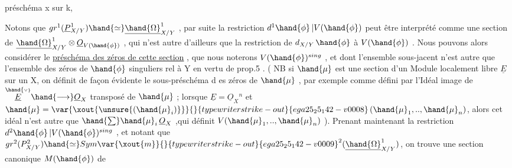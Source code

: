 
préschéma x sur k, 

Notons que $gr^1(\underline{P}^1_{X/Y}) \hand{\simeq} \underline{\hand{\Omega}}^1_{X/Y}$ , par suite la restriction
$d^1\hand{\phi}\,|V(\hand{\phi})$ peut être interprété comme une section de $\underline{\hand{\Omega}}^1_{X/Y} \otimes \underline{O}_{V(\hand{\phi})}$ ,
qui n'est autre d'ailleurs que la restriction de $d_{X/Y}\,\hand{\phi}$ à $V(\hand{\phi})$ . Nous
pouvons alors considérer le \uline{préschéma des zéros de cette section} , que
nous noterons $V(\hand{\phi})^{sing}$ , et dont l'ensemble sous-jacent n'est autre
que l'ensemble des zéros de $\hand{\phi}$ singuliers rel à Y en vertu de prop.5 .
( NB si  $\hand{\mu}$ est une section d'un Module localement libre  $\underline{E}$ sur un
  X, on définit de façon évidente le sous-préschéma d es
zéros de $\hand{\mu}$ , par exemple comme défini par l'Idéal image de $\overset{\hand{\scriptscriptstyle\vee}}{\underline{E}} \hand{\longrightarrow} \underline{O}_X$
transposé de $\hand{\mu}$ ; lorsque $\underline{E} = \underline{O}_X{}^n$ et $\hand{\mu} = \var{\xout{\unsure{(\hand{\mu}_i)}}}{}{typewriter strike-out}{ega25_25_142-v0008}\,(\hand{\mu}_1,..,\hand{\mu}_n)$, alors cet
idéal n'est autre que $\hand{\sum} \hand{\mu}_i\,\underline{O}_X$ ,qui définit $V(\hand{\mu}_1,..,\hand{\mu}_n)$ ). Prenant
maintenant la restriction $d^2\hand{\phi}\,|V(\hand{\phi})^{sing}$ , et notant que
$gr^2(P^2_{X/Y}) \hand{\simeq} Sym\var{\xout{m}}{}{typewriter strike-out}{ega25_25_142-v0009}^2(\underline{\hand{\Omega}}^1_{X/Y})$, on trouve une section canonique $M(\hand{\phi})$ de
